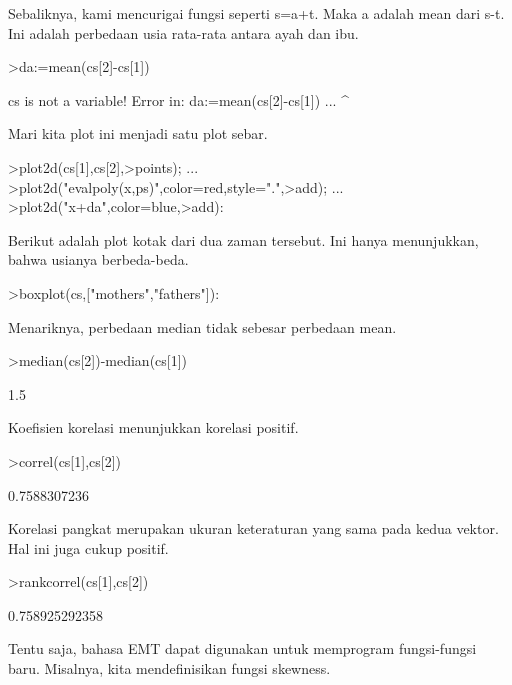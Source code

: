 \documentclass[a4paper,10pt]{article}
\begin{document}
\begin{eulernotebook}
\begin{eulercomment}
\begin{eulercomment}
\begin{eulercomment}
Sebaliknya, kami mencurigai fungsi seperti s=a+t. Maka a adalah mean
dari s-t. Ini adalah perbedaan usia rata-rata antara ayah dan ibu.
\end{eulercomment}
\begin{eulerprompt}
>da:=mean(cs[2]-cs[1])
\end{eulerprompt}
\begin{euleroutput}
  cs is not a variable!
  Error in:
  da:=mean(cs[2]-cs[1]) ...
                ^
\end{euleroutput}
\begin{eulercomment}
Mari kita plot ini menjadi satu plot sebar.
\end{eulercomment}
\begin{eulerprompt}
>plot2d(cs[1],cs[2],>points);  ...
>plot2d("evalpoly(x,ps)",color=red,style=".",>add);  ...
>plot2d("x+da",color=blue,>add):
\end{eulerprompt}
\begin{eulercomment}
Berikut adalah plot kotak dari dua zaman tersebut. Ini hanya
menunjukkan, bahwa usianya berbeda-beda.
\end{eulercomment}
\begin{eulerprompt}
>boxplot(cs,["mothers","fathers"]):
\end{eulerprompt}
\begin{eulercomment}
Menariknya, perbedaan median tidak sebesar perbedaan mean.
\end{eulercomment}
\begin{eulerprompt}
>median(cs[2])-median(cs[1])
\end{eulerprompt}
\begin{euleroutput}
  1.5
\end{euleroutput}
\begin{eulercomment}
Koefisien korelasi menunjukkan korelasi positif.
\end{eulercomment}
\begin{eulerprompt}
>correl(cs[1],cs[2])
\end{eulerprompt}
\begin{euleroutput}
  0.7588307236
\end{euleroutput}
\begin{eulercomment}
Korelasi pangkat merupakan ukuran keteraturan yang sama pada kedua
vektor. Hal ini juga cukup positif.
\end{eulercomment}
\begin{eulerprompt}
>rankcorrel(cs[1],cs[2])
\end{eulerprompt}
\begin{euleroutput}
  0.758925292358
\end{euleroutput}
\begin{eulercomment}
Tentu saja, bahasa EMT dapat digunakan untuk memprogram fungsi-fungsi
baru. Misalnya, kita mendefinisikan fungsi skewness.


\end{eulercomment}
\end{eulercomment}
\end{eulercomment}
\end{eulernotebook}
\end{document}
